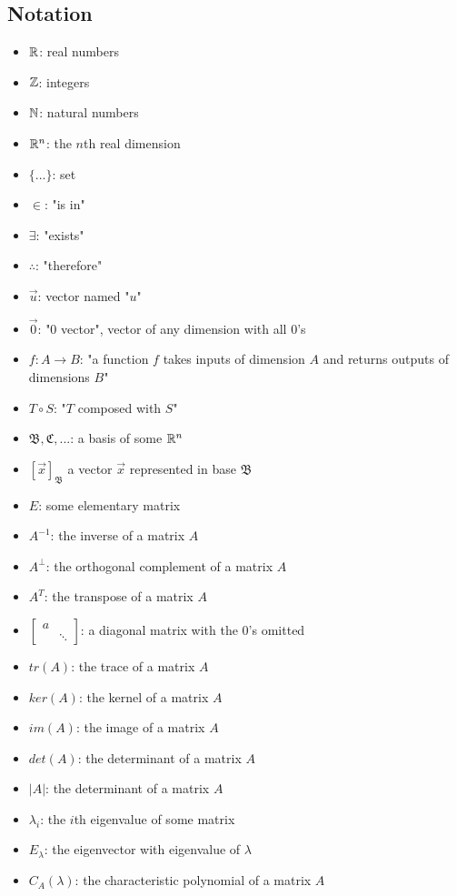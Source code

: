 \documentclass[12pt]{article}
\begin{document}
{\subsection{Notation}
    \begin{itemize}
        \item $\mathbb{R}$: real numbers
        \item $\mathbb{Z}$: integers
        \item $\mathbb{N}$: natural numbers
        \item $\mathbb{R}^n$: the $n$th real dimension
        \item $\{...\}$: set
        \item $\in$: "is in"
        \item $\exists$: "exists"
        \item $\therefore$: "therefore"
        \item $\Vec{u}$: vector named "$u$"
        \item $\Vec{0}$: "0 vector", vector of any dimension with all $0$'s
        \item $f: A \to B$: "a function $f$ takes inputs of dimension $A$ and returns outputs of dimensions $B$"
        \item $T \circ S$: "$T$ composed with $S$"
        \item $\mathfrak{B}, \mathfrak{C}, ...$: a basis of some $\mathbb{R}^n$
        \item $[\vec{x}]_{\mathfrak{B}}$ a vector $\vec{x}$ represented in base $\mathfrak{B}$
        \item $E$: some elementary matrix
       \item $A^{-1}$: the inverse of a matrix $A$
       \item $A^\bot$: the orthogonal complement of a matrix $A$
       \item $A^T$: the transpose of a matrix $A$
       \item $\begin{bmatrix}
           a & \\
            & \ddots
         \end{bmatrix}$: a diagonal matrix with the $0$'s omitted
       \item $tr(A)$: the trace of a matrix $A$
       \item $ker(A)$: the kernel of a matrix $A$
       \item $im(A)$: the image of a matrix $A$
       \item $det(A)$: the determinant of a matrix $A$
       \item $|A|$: the determinant of a matrix $A$
       \item $\lambda_i$: the $i$th eigenvalue of some matrix
       \item $E_\lambda$: the eigenvector with eigenvalue of $\lambda$
       \item $C_A(\lambda)$: the characteristic polynomial of a matrix $A$
    \end{itemize}
}
\end{document}
